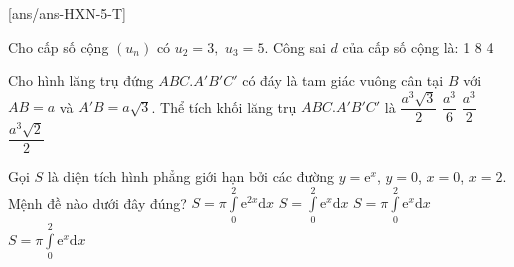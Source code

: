 \def\sode{5}
\begin{name}
	{\tenchude}
	{\tendethi}
	{\tentruong}
	{\thoigian}
\end{name}
[ans/ans-HXN-\sode-T]
\caulc
\begin{ex}%
	Cho cấp số cộng $\left(u_n\right)$ có $u_2=3,\,\,u_3=5$. Công sai $d$ của cấp số cộng là:
	\choice
	{1}
	{}
	{8}
	{4}
\end{ex}
\begin{ex}%
\end{ex}
\begin{ex}%
	Cho hình lăng trụ đứng $ ABC.A'{B}'{C}'$ có đáy là tam giác vuông cân tại $ B$ với $ AB=a$ và $A'B=a\sqrt{3}$. Thể tích khối lăng trụ $ ABC.A'{B}'{C}'$ là
	\choice
	{$\dfrac{a^3\sqrt{3}}{2}$}
	{$\dfrac{a^3}{6}$}
	{$\dfrac{a^3}{2}$}
	{\True $\dfrac{a^3\sqrt{2}}{2}$}
\end{ex}
\begin{ex}%
	Gọi $ S$ là diện tích hình phẳng giới hạn bởi các đường $ y=\text{e}^x$, $ y=0$, $ x=0$, $ x=2$. Mệnh đề nào dưới đây đúng?
	\choice
	{$ S=\pi\displaystyle\int\limits_0^2\text{e}^{2x}\text{d}x$}
	{\True $ S=\displaystyle\int\limits_0^2\text{e}^x\text{d}x$}
	{$ S=\pi\displaystyle\int\limits_0^2\text{e}^x\text{d}x$}
	{$ S=\pi\displaystyle\int\limits_0^2\text{e}^x\text{d}x$}
\end{ex}

